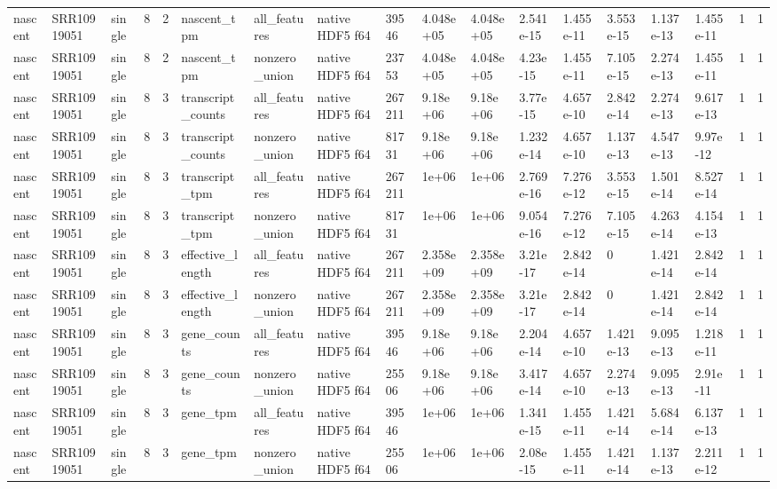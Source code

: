 \begin{tabular}{llllllllllllllllll}
nascent & SRR10919051 & single & 8 & 2 & nascent\_tpm & all\_features & native HDF5 f64 & 39546 & 4.048e+05 & 4.048e+05 & 2.541e-15 & 1.455e-11 & 3.553e-15 & 1.137e-13 & 1.455e-11 & 1 & 1 \\
nascent & SRR10919051 & single & 8 & 2 & nascent\_tpm & nonzero\_union & native HDF5 f64 & 23753 & 4.048e+05 & 4.048e+05 & 4.23e-15 & 1.455e-11 & 7.105e-15 & 2.274e-13 & 1.455e-11 & 1 & 1 \\
nascent & SRR10919051 & single & 8 & 3 & transcript\_counts & all\_features & native HDF5 f64 & 267211 & 9.18e+06 & 9.18e+06 & 3.77e-15 & 4.657e-10 & 2.842e-14 & 2.274e-13 & 9.617e-13 & 1 & 1 \\
nascent & SRR10919051 & single & 8 & 3 & transcript\_counts & nonzero\_union & native HDF5 f64 & 81731 & 9.18e+06 & 9.18e+06 & 1.232e-14 & 4.657e-10 & 1.137e-13 & 4.547e-13 & 9.97e-12 & 1 & 1 \\
nascent & SRR10919051 & single & 8 & 3 & transcript\_tpm & all\_features & native HDF5 f64 & 267211 & 1e+06 & 1e+06 & 2.769e-16 & 7.276e-12 & 3.553e-15 & 1.501e-14 & 8.527e-14 & 1 & 1 \\
nascent & SRR10919051 & single & 8 & 3 & transcript\_tpm & nonzero\_union & native HDF5 f64 & 81731 & 1e+06 & 1e+06 & 9.054e-16 & 7.276e-12 & 7.105e-15 & 4.263e-14 & 4.154e-13 & 1 & 1 \\
nascent & SRR10919051 & single & 8 & 3 & effective\_length & all\_features & native HDF5 f64 & 267211 & 2.358e+09 & 2.358e+09 & 3.21e-17 & 2.842e-14 & 0 & 1.421e-14 & 2.842e-14 & 1 & 1 \\
nascent & SRR10919051 & single & 8 & 3 & effective\_length & nonzero\_union & native HDF5 f64 & 267211 & 2.358e+09 & 2.358e+09 & 3.21e-17 & 2.842e-14 & 0 & 1.421e-14 & 2.842e-14 & 1 & 1 \\
nascent & SRR10919051 & single & 8 & 3 & gene\_counts & all\_features & native HDF5 f64 & 39546 & 9.18e+06 & 9.18e+06 & 2.204e-14 & 4.657e-10 & 1.421e-13 & 9.095e-13 & 1.218e-11 & 1 & 1 \\
nascent & SRR10919051 & single & 8 & 3 & gene\_counts & nonzero\_union & native HDF5 f64 & 25506 & 9.18e+06 & 9.18e+06 & 3.417e-14 & 4.657e-10 & 2.274e-13 & 9.095e-13 & 2.91e-11 & 1 & 1 \\
nascent & SRR10919051 & single & 8 & 3 & gene\_tpm & all\_features & native HDF5 f64 & 39546 & 1e+06 & 1e+06 & 1.341e-15 & 1.455e-11 & 1.421e-14 & 5.684e-14 & 6.137e-13 & 1 & 1 \\
nascent & SRR10919051 & single & 8 & 3 & gene\_tpm & nonzero\_union & native HDF5 f64 & 25506 & 1e+06 & 1e+06 & 2.08e-15 & 1.455e-11 & 1.421e-14 & 1.137e-13 & 2.211e-12 & 1 & 1 \\

\end{tabular}
